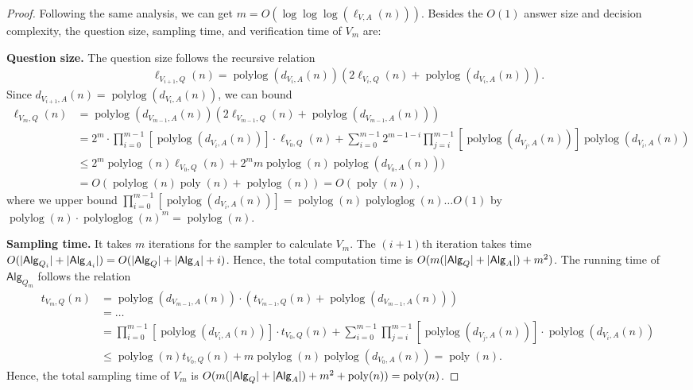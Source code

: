 \documentclass[11pt]{article}
\theoremstyle{plain}
\theoremstyle{definition}
\DeclarePairedDelimiter{\abs}{\lvert}{\rvert}
\newcommand{\poly} {\ensuremath{\operatorname{poly}}}
\newcommand{\polylog} {\ensuremath{\operatorname{polylog}}}
\newcommand{\polyloglog} {\ensuremath{\operatorname{polyloglog}}}
\newcommand{\1}{\mathbb{1}} %
\newcommand{\Alg}{\mathsf{Alg}}
\begin{document}
\begin{proof}
Following the same analysis, we can get $m = O(\log\log\log(\ell_{V,A}(n)))$.
Besides the $O(1)$ answer size and decision complexity, the question size, sampling time, and verification time of $V_m$ are:

\textbf{Question size.} The question size follows the recursive relation 
\begin{align*}
    \ell_{V_{i+1},Q}(n) =  \polylog(d_{V_i,A}(n))(2 \ell_{V_i, Q}(n) +  \polylog(d_{V_i,A}(n))).
\end{align*}
Since $d_{V_{i+1},A}(n) = \polylog(d_{V_i,A}(n))$, we can bound 
\begin{align*}
    \ell_{V_m, Q}(n) &= \polylog(d_{V_{m-1},A}(n))(2 \ell_{V_{m-1},Q}(n) + \polylog(d_{V_{m-1},A}(n))) \\
    &= 2^m \cdot \prod_{i=0}^{m-1} [\polylog(d_{V_i,A}(n))] \cdot \ell_{V_0, Q}(n) + \sum_{i=0}^{m-1} 2^{m-1-i} \prod_{j=i}^{m-1} [\polylog(d_{V_j,A}(n))] \polylog(d_{V_i,A}(n)) \\
    &\leq 2^m \polylog(n)\ell_{V_0, Q}(n) + 2^m m \polylog(n) \polylog(d_{V_0,A}(n))) \\
    &= O(\polylog(n) \poly(n) + \polylog(n)) = O(\poly(n)),
\end{align*}
where we upper bound $\prod_{i=0}^{m-1} [\polylog(d_{V_i,A}(n))] = \polylog(n) \polyloglog(n) \ldots O(1)$ by
$\polylog(n) \cdot \polyloglog(n)^m = \polylog(n)$.

\textbf{Sampling time.} It takes $m$ iterations for the sampler to calculate $V_m$. 
The $(i+1)$th iteration takes time $O( \abs{\Alg_{Q_i}}+ \abs{\Alg_{A_i}}) = O(\abs{\Alg_{Q}} + \abs{\Alg_{A}} +i)$.
    Hence, the total computation time is $O( m(\abs{\Alg_{Q}} + \abs{\Alg_{A}}) + m^2)$.
The running time of $\Alg_{Q_m}$ follows the relation
\begin{align*}
    t_{V_m,Q}(n) &= \polylog(d_{V_{m-1},A}(n)) \cdot (t_{V_{m-1},Q}(n) + \polylog(d_{V_{m-1},A}(n))) \\
    &= \ldots \\
    &= \prod_{i=0}^{m-1} [\polylog(d_{V_i,A}(n))] \cdot t_{V_0, Q}(n) + \sum_{i=0}^{m-1} \prod_{j=i}^{m-1} [\polylog(d_{V_j,A}(n))] \cdot 
    \polylog(d_{V_{i},A}(n)) \\
    &\leq \polylog(n) t_{V_0, Q}(n) + m \polylog(n) \polylog(d_{V_0,A}(n)) = \poly(n).
\end{align*}
Hence, the total sampling time of $V_m$ is $O( m(\abs{\Alg_{Q}} + \abs{\Alg_{A}}) + m^2 + \poly(n)) = \poly(n)$.


\end{proof}
\end{document}
